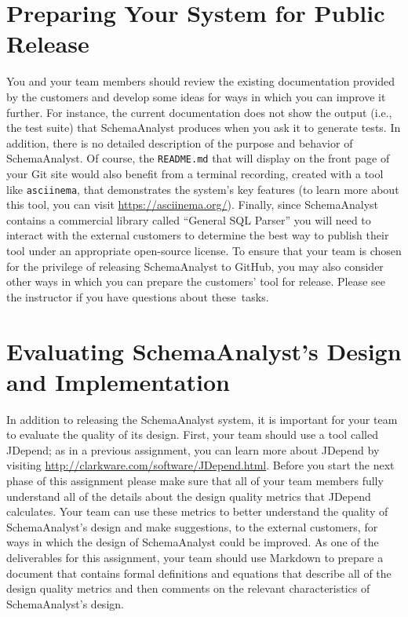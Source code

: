 \vspace*{-.05in}
\section*{Preparing Your System for Public Release}

You and your team members should review the existing documentation provided by the customers and develop some ideas for
ways in which you can improve it further. For instance, the current documentation does not show the output (i.e., the
test suite) that SchemaAnalyst produces when you ask it to generate tests. In addition, there is no detailed description
of the purpose and behavior of SchemaAnalyst. Of course, the {\tt README.md} that will display on the front page of your
Git site would also benefit from a terminal recording, created with a tool like {\tt asciinema}, that demonstrates the
system's key features (to learn more about this tool, you can visit \url{https://asciinema.org/}). Finally, since
SchemaAnalyst contains a commercial library called ``General SQL Parser'' you will need to interact with the external
customers to determine the best way to publish their tool under an appropriate open-source license. To ensure that your
team is chosen for the privilege of releasing SchemaAnalyst to GitHub, you may also consider other ways in
which you can prepare the customers' tool for release. Please see the instructor if you have questions about \mbox{these
tasks}.

\section*{Evaluating SchemaAnalyst's Design and Implementation}

In addition to releasing the SchemaAnalyst system, it is important for your team to evaluate the quality of its design.
First, your team should use a tool called JDepend; as in a previous assignment, you can learn more about JDepend by
visiting \url{http://clarkware.com/software/JDepend.html}.  Before you start the next phase of this assignment please
make sure that all of your team members fully understand all of the details about the design quality metrics that
JDepend calculates.  Your team can use these metrics to better understand the quality of SchemaAnalyst's design and
make suggestions, to the external customers, for ways in which the design of SchemaAnalyst could be improved. As one of
the deliverables for this assignment, your team should use Markdown to prepare a document that contains formal
definitions and equations that describe all of the design quality metrics and then comments on the relevant
characteristics of SchemaAnalyst's design.

